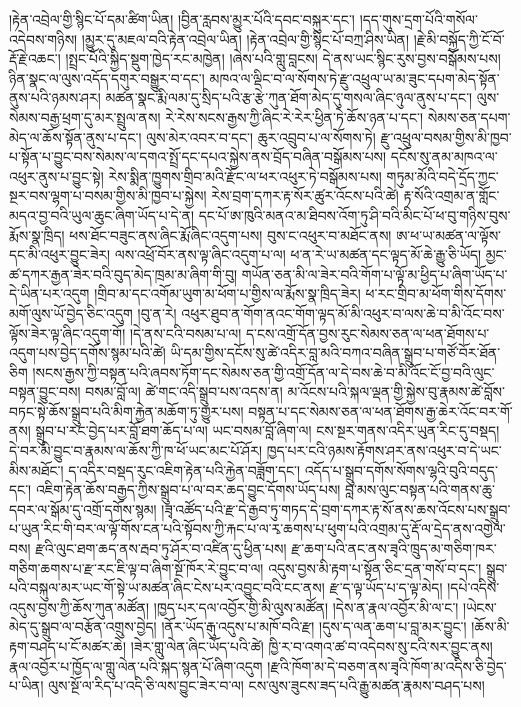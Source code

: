 \documentclass{article}
\begin{document}
།རྟེན་འབྲེལ་གྱི་སྙིང་པོ་དམ་ཚིག་ཡིན། །བྱིན་རླབས་མྱུར་པོའི་དབང་བསྐུར་དང་། །དད་གུས་དྲག་པོའི་གསོལ་འདེབས་གཉིས། །མྱུར་དུ་མཇལ་བའི་རྟེན་འབྲེལ་ཡིན། །རྟེན་འབྲེལ་གྱི་སྙིང་པོ་བཀྲ་ཤིས་ཡིན། །རྗེ་མི་བསྐྱོད་ཀྱི་ངོ་བོ་རྡོ་རྗེ་འཆང་། །སྤྲང་པོའི་སྐྱིད་སྡུག་ཁྱེད་རང་མཁྱེན། །ཞེས་པའི་གླུ་བླངས། དེ་ནས་ཡང་སྙིང་རུས་བྱས་བསྒོམས་པས། ཉིན་སྣང་ལ་ལུས་འདོད་དགུར་བསྒྱུར་བ་དང་། མཁའ་ལ་ལྡིང་བ་ལ་སོགས་ཏེ་རྫུ་འཕྲུལ་ཡ་མ་ཟུང་དཔག་མེད་སྟོན་ནུས་པའི་ཉམས་ཤར། མཚན་སྣང་རྨི་ལམ་དུ་སྲིད་པའི་རྩ་རྩེ་ཀུན་ཐོག་མེད་དུ་གསལ་ཞིང་ཉུལ་ནུས་པ་དང་། ལུས་སེམས་བརྒྱ་ཕྲག་དུ་མར་སྤྲུལ་ནས། རེ་རེས་སངས་རྒྱས་ཀྱི་ཞིང་རེ་རེར་ཕྱིན་ཏེ་ཆོས་ཉན་པ་དང་། སེམས་ཅན་དཔག་མེད་ལ་ཆོས་སྟོན་ནུས་པ་དང་། ལུས་མེར་འབར་བ་དང་། ཆུར་འབྲུབ་པ་ལ་སོགས་ཏེ། རྫུ་འཕྲུལ་བསམ་གྱིས་མི་ཁྱབ་པ་སྟོན་པ་བྱུང་བས་སེམས་ལ་དགའ་སྤྲོ་དང་དཔའ་སྐྱེས་ནས་བྲོད་བཞིན་བསྒོམས་པས། དངོས་སུ་ནམ་མཁའ་ལ་འཕུར་ནུས་པ་བྱུང་སྟེ། རེས་སྨིན་ཁྱུགས་གྲིབ་མའི་རྫོང་ལ་ཕར་འཕུར་ཏེ་བསྒོམས་པས། གཏུམ་མོའི་བདེ་དྲོད་ཀྱང་སྔར་བས་ལྷག་པ་བསམ་གྱིས་མི་ཁྱབ་པ་སྐྱེས། རེས་བྲག་དཀར་རྟ་སོར་ཚུར་འོངས་པའི་ཚེ། རྟ་སོའི་འགྲམ་ན་གློང་མདའ་བྱ་བའི་ཡུལ་ཆུང་ཞིག་ཡོད་པ་དེ་ན། དང་པོ་ཨ་ཁུའི་མནའ་མ་ཐིབས་འོག་ཏུ་ཤི་བའི་མིང་པོ་ཕ་བུ་གཉིས་བུས་རྨོས་སྣ་ཁྲིད། ཕས་ཐོང་བཟུང་ནས་ཞིང་རྨོ་ཞིང་འདུག་པས། བུས་ང་འཕུར་བ་མཐོང་ནས། ཨ་ཕ་ཡ་མཚན་ལ་ལྟོས་དང་མི་འཕུར་བྱུང་ཟེར། ལས་འཕྲོ་བོར་ནས་ལྟ་ཞིང་འདུག་པ་ལ། ཕ་ན་རེ་ཡ་མཚན་དང་ལྟད་མོ་ཆེ་རྒྱུ་ཅི་ཡོད། མྱང་ཚ་དཀར་རྒྱན་ཟེར་བའི་བུད་མེད་ཁྲམ་མ་ཞིག་གི་བུ། གཡོན་ཅན་མི་ལ་ཟེར་བའི་གོག་པ་ལྟོ་མ་ཕྱིད་པ་ཞིག་ཡོད་པ་དེ་ཡིན་པར་འདུག །གྲིབ་མ་དང་འགོམ་ཡུག་མ་ཕོག་པ་གྱིས་ལ་རྨོས་སྣ་ཁྲིད་ཟེར། ཕ་རང་གྲིབ་མ་ཕོག་གིས་དོགས་མགོ་ལུས་ཡོ་བྱེད་ཅིང་འདུག །བུ་ན་རེ། འཕུར་ཐུབ་ན་གོག་ནའང་གོག་ལྟད་མོ་མི་འཕུར་བ་ལས་ཆེ་བ་མི་འོང་བས་ལྟོས་ཟེར་ལྟ་ཞིང་འདུག་གོ། །དེ་ནས་ངའི་བསམ་པ་ལ། ད་ངས་འགྲོ་དོན་བྱས་རུང་སེམས་ཅན་ལ་ཕན་ཐོགས་པ་འདུག་པས་བྱེད་དགོས་སྙམ་པའི་ཚེ། ཡི་དམ་གྱིས་དངོས་སུ་ཚེ་འདིར་བླ་མའི་བཀའ་བཞིན་སྒྲུབ་པ་གཙོ་བོར་ཐོན་ཅིག །སངས་རྒྱས་ཀྱི་བསྟན་པའི་ཞབས་ཏོག་དང་སེམས་ཅན་གྱི་འགྲོ་དོན་ལ་དེ་བས་ཆེ་བ་མི་འོང་ངོ་བྱ་བའི་ལུང་བསྟན་བྱུང་བས། བསམ་བློ་ལ། ཚེ་གང་འདི་སྒྲུབ་པས་འདས་ན། མ་འོངས་པའི་སྐལ་ལྡན་གྱི་སྐྱེས་བུ་རྣམས་ཚེ་བློས་བཏང་སྟེ་ཆོས་སྒྲུབ་པའི་མིག་རྐྱེན་མཆོག་ཏུ་གྱུར་པས། བསྟན་པ་དང་སེམས་ཅན་ལ་ཕན་ཐོགས་རྒྱ་ཆེར་འོང་བར་གོ་ནས། སྒྲུབ་པ་རང་བྱེད་པར་བློ་ཐག་ཆོད་པ་ལ། ཡང་བསམ་བློ་ཞིག་ལ། ངས་སྔར་གནས་འདིར་ཡུན་རིང་དུ་བསྡད། དེ་བར་མི་བྱུང་བ་རྣམས་ལ་ཆོས་ཀྱི་ཁ་ཕོ་ཡང་མང་པོ་ཤོར། ཁྱད་པར་ངའི་ཉམས་རྟོགས་ཤར་ནས་འཕུར་བ་དེ་ཡང་མིས་མཐོང་། ད་འདིར་བསྡད་རུང་འཇིག་རྟེན་པའི་རྐྱེན་བཟློག་དང་། འདོད་པ་སྒྲུབ་དགོས་སོགས་ལྷའི་བུའི་བདུད་དང་། འཇིག་རྟེན་ཆོས་བརྒྱད་ཀྱིས་སྒྲུབ་པ་ལ་བར་ཆད་བྱུང་དོགས་ཡོད་པས། བླ་མས་ལུང་བསྟན་པའི་གནས་ཆུ་དབར་ལ་སྒོམ་དུ་འགྲོ་དགོས་སྙམ། །ཟྭ་འཚོད་པའི་རྫ་དེ་རྒྱབ་ཏུ་གཏད་དེ་བྲག་དཀར་རྟ་སོ་ནས་ཆས་འོངས་པས་སྒྲུབ་པ་ཡུན་རིང་གི་བར་ལ་ལྟོ་གོས་ངན་པའི་སྟོབས་ཀྱི་རྐང་པ་ལ་རྭ་ཆགས་པ་ཕུག་པའི་འགྲམ་དུ་རྡོ་ལ་དྲེད་ནས་འགྱེལ་བས། རྫའི་ལུང་ཐག་ཆད་ནས་རྦབ་ཏུ་ཤོར་བ་འཛིན་དུ་ཕྱིན་པས། རྫ་ཆག་པའི་ནང་ནས་ཟྭའི་ཁྲུད་མ་གཅིག་ཁར་གཅིག་ཆགས་པ་རྫ་རང་ཇི་ལྟ་བ་ཞིག་སྔོ་ཁོར་རེ་བྱུང་བ་ལ། འདུས་བྱས་མི་རྟག་པ་སྟོན་ཅིང་དྲན་གསོ་བ་དང་། སྒྲུབ་པའི་བསྐུལ་མར་ཡང་གོ་སྟེ་ཡ་མཚན་ཞིང་ངེས་པར་འབྱུང་བའི་ངང་ནས། རྫ་ད་ལྟ་ཡོད་པ་ད་ལྟ་མེད། །དཔེ་འདིས་འདུས་བྱས་ཀྱི་ཆོས་ཀུན་མཚོན། །ཁྱད་པར་དལ་འབྱོར་གྱི་མི་ལུས་མཚོན། །དེས་ན་རྣལ་འབྱོར་མི་ལ་ང་། །ཡེངས་མེད་དུ་སྒྲུབ་ལ་བརྩོན་འགྲུས་བྱེད། །ནོར་ཡོད་རྒུ་འདུས་པ་མཁོ་བའི་རྫ། །དུས་ད་ལན་ཆག་པ་བླ་མར་བྱུང་། །ཆོས་མི་རྟག་བཤད་པ་ངོ་མཚར་ཆེ། །ཟེར་གླུ་ལེན་ཞིང་ཡོད་པའི་ཚེ། ཁྱི་ར་བ་འགའ་ཚ་བ་འདེབས་སུ་ངའི་སར་བྱུང་ནས། རྣལ་འབྱོར་པ་ཁྱོད་ལ་གླུ་ལེན་པའི་སྐད་སྙན་པོ་ཞིག་འདུག །རྫའི་ཁོག་མ་དེ་བཅག་ནས་ཟྭའི་ཁོག་མ་འདིས་ཅི་བྱེད་པ་ཡིན། ལུས་སྔོ་ལ་རིད་པ་འདི་ཅི་ལས་བྱུང་ཟེར་བ་ལ། ངས་ལུས་ཟུངས་ཟད་པའི་རྒྱུ་མཚན་རྣམས་བཤད་པས། 
\end{document}
